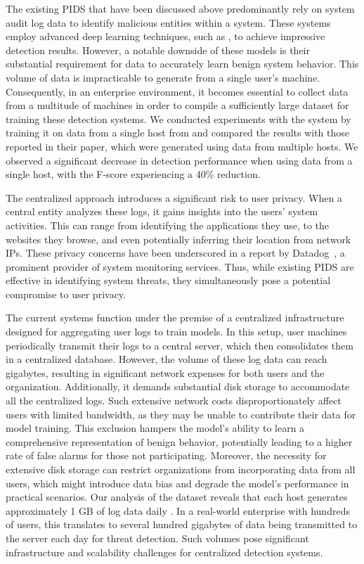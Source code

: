  The existing PIDS that have been discussed above predominantly rely on system audit log data to identify malicious entities within a system. These systems employ advanced deep learning techniques, such as \gnn, to achieve impressive detection results. However, a notable downside of these models is their substantial requirement for data to accurately learn benign system behavior. This volume of data is impracticable to generate from a single user's machine. Consequently, in an enterprise environment, it becomes essential to collect data from a multitude of machines in order to compile a sufficiently large dataset for training these detection systems.  We conducted experiments with the \flash system by training it on data from a single host from \optc and compared the results with those reported in their paper, which were generated using data from multiple hosts. We observed a significant decrease in detection performance when using data from a single host, with the F-score experiencing a 40\% reduction.


The centralized approach introduces a significant risk to user privacy. When a central entity analyzes these logs, it gains insights into the users' system activities. This can range from identifying the applications they use, to the websites they browse, and even potentially inferring their location from network IPs. These privacy concerns have been underscored in a report by Datadog~\cite{datadog}, a prominent provider of system monitoring services. Thus, while existing PIDS are effective in identifying system threats, they simultaneously pose a potential compromise to user privacy.

 The current systems function under the premise of a centralized infrastructure designed for aggregating user logs to train models. In this setup, user machines periodically transmit their logs to a central server, which then consolidates them in a centralized database. However, the volume of these log data can reach gigabytes, resulting in significant network expenses for both users and the organization. Additionally, it demands substantial disk storage to accommodate all the centralized logs. Such extensive network costs disproportionately affect users with limited bandwidth, as they may be unable to contribute their data for model training. This exclusion hampers the model's ability to learn a comprehensive representation of benign behavior, potentially leading to a higher rate of false alarms for those not participating. Moreover, the necessity for extensive disk storage can restrict organizations from incorporating data from all users, which might introduce data bias and degrade the model's performance in practical scenarios. Our analysis of the \optc dataset reveals that each host generates approximately 1 GB of log data daily . In a real-world enterprise with hundreds of users, this translates to several hundred gigabytes of data being transmitted to the server each day for threat detection. Such volumes pose significant infrastructure and scalability challenges for centralized detection systems.

